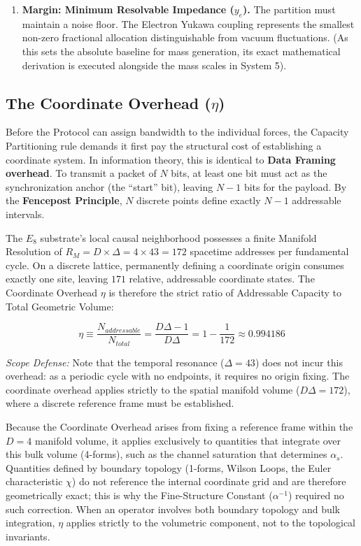 \begin{enumerate}
    \item \textbf{Margin: Minimum Resolvable Impedance ($y_e$).} 
    The partition must maintain a noise floor. The Electron Yukawa coupling represents the smallest non-zero fractional allocation distinguishable from vacuum fluctuations. (As this sets the absolute baseline for mass generation, its exact mathematical derivation is executed alongside the mass scales in System 5).
\end{enumerate}

\subsection{The Coordinate Overhead (\texorpdfstring{$\eta$}{eta})}

Before the Protocol can assign bandwidth to the individual forces, the Capacity Partitioning rule demands it first pay the structural cost of establishing a coordinate system. In information theory, this is identical to \textbf{Data Framing overhead}. To transmit a packet of $N$ bits, at least one bit must act as the synchronization anchor (the ``start'' bit), leaving $N-1$ bits for the payload. By the \textbf{Fencepost Principle}, $N$ discrete points define exactly $N-1$ addressable intervals.

The $E_8$ substrate's local causal neighborhood possesses a finite Manifold Resolution of $R_M = D \times \Delta = 4 \times 43 = 172$ spacetime addresses per fundamental cycle. On a discrete lattice, permanently defining a coordinate origin consumes exactly one site, leaving $171$ relative, addressable coordinate states. The Coordinate Overhead $\eta$ is therefore the strict ratio of Addressable Capacity to Total Geometric Volume:

\begin{equation}
\label{eq:coordinate_overhead}
\eta \equiv \frac{N_{addressable}}{N_{total}} = \frac{D\Delta - 1}{D\Delta} = 1 - \frac{1}{172} \approx 0.994186
\end{equation}

\textit{Scope Defense:} Note that the temporal resonance ($\Delta = 43$) does not incur this overhead: as a periodic cycle with no endpoints, it requires no origin fixing. The coordinate overhead applies strictly to the spatial manifold volume ($D\Delta = 172$), where a discrete reference frame must be established.

Because the Coordinate Overhead arises from fixing a reference frame within the $D=4$ manifold volume, it applies exclusively to quantities that integrate over this bulk volume (4-forms), such as the channel saturation that determines $\alpha_s$. Quantities defined by boundary topology (1-forms, Wilson Loops, the Euler characteristic $\chi$) do not reference the internal coordinate grid and are therefore geometrically exact; this is why the Fine-Structure Constant ($\alpha^{-1}$) required no such correction. When an operator involves both boundary topology and bulk integration, $\eta$ applies strictly to the volumetric component, not to the topological invariants.